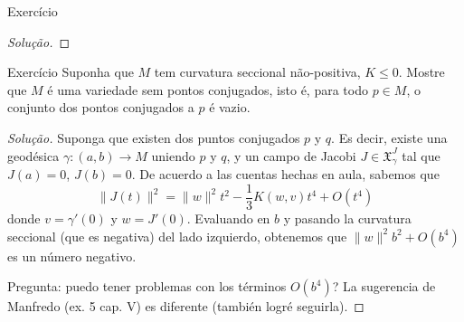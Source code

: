 \begin{thing6}{Exercício}
\begin{proof}[Solução]
\iffalse
Considere un campo \(X\) que sea la traslación paralela de un vector cualquiera en \(T_pM\) a lo largo de geodésicas radiales. La pregunta es si puedo concluir que
\[\nabla_{\partial_t}X=0.\]
La sugerencia de Manfredo \fi\end{proof}
\end{thing6}

\begin{thing6}{Exercício}\label{exer:}\leavevmode
Suponha que \(M\) tem curvatura seccional não-positiva, \(K \leq 0\). Mostre que \(M\) é uma variedade sem pontos conjugados, isto é, para todo \(p \in M\), o conjunto dos pontos conjugados a \(p\) é vazio.
\end{thing6}

\begin{proof}[Solução]\leavevmode
	Suponga que existen dos puntos conjugados \(p\) y \(q\). Es decir, existe una geodésica \(\gamma:(a,b) \to M\) uniendo \(p\) y \(q\), y un campo de Jacobi \(J \in \mathfrak{X}^J_\gamma\) tal que \(J(a)=0\),  \(J(b)=0\).  De acuerdo a las cuentas hechas en aula, sabemos que
\[\|J(t)\|^2=\|w\|^2t^2-\frac{1}{3}K(w,v)t^4+O(t^4)\]
donde \(v=\gamma'(0)\) y \(w=J'(0)\). Evaluando en \(b\) y pasando la curvatura seccional (que es negativa) del lado izquierdo, obtenemos que \(\|w\|^2b^2+O(b^4)\) es un número negativo.

{\color{2}Pregunta:} puedo tener problemas con los términos \(O(b^4)\)? La sugerencia de Manfredo (ex. 5 cap. V) es diferente (también logré seguirla).
\end{proof}
\clearpage
